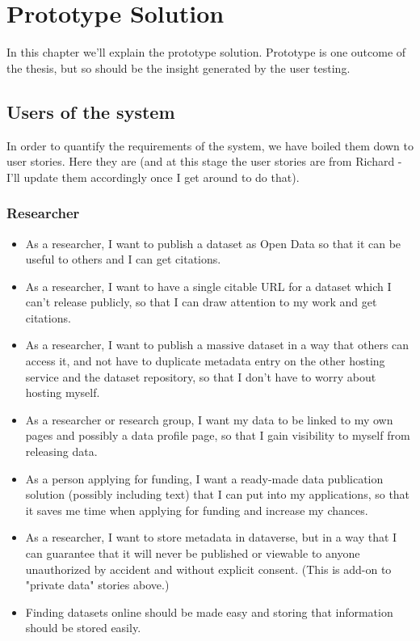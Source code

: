 \chapter{Prototype Solution}
\label{chapter:prototype}

In this chapter we'll explain the prototype solution. Prototype is one outcome
of the thesis, but so should be the insight generated by the user testing.

\section{Users of the system}
\label{sec:users}

In order to quantify the requirements of the system, we have boiled them down
to user stories. Here they are (and at this stage the user stories are from
Richard - I'll update them accordingly once I get around to do that).

\subsection{Researcher}

\begin{itemize}
    \item As a researcher, I want to publish a dataset as Open Data so that it
          can be useful to others and I can get citations.
    \item As a researcher, I want to have a single citable URL for a dataset
          which I can't release publicly, so that I can draw attention to my
          work and get citations. 
    \item As a researcher, I want to publish a massive dataset in a way that
          others can access it, and not have to duplicate metadata entry on the
          other hosting service and the dataset repository, so that I don't have
          to worry about hosting myself. 
    \item As a researcher or research group, I want my data to be linked to my
          own pages and possibly a data profile page, so that I gain visibility
          to myself from releasing data. 
    \item As a person applying for funding, I want a ready-made data publication
          solution (possibly including text) that I can put into my
          applications, so that it saves me time when applying for funding and
          increase my chances. 
    \item As a researcher, I want to store metadata in dataverse, but in a way
          that I can guarantee that it will never be published or viewable to
          anyone unauthorized by accident and without explicit consent.  (This
          is add-on to "private data" stories above.)
    \item Finding datasets online should be made easy and storing that information
          should be stored easily.
\end{itemize}

